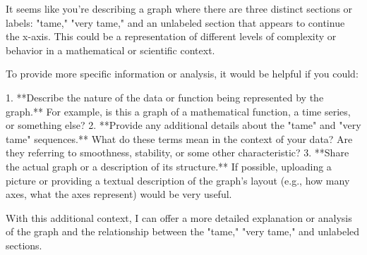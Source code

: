 It seems like you're describing a graph where there are three distinct sections or labels: "tame," "very tame," and an unlabeled section that appears to continue the x-axis. This could be a representation of different levels of complexity or behavior in a mathematical or scientific context.

To provide more specific information or analysis, it would be helpful if you could:

1. **Describe the nature of the data or function being represented by the graph.** For example, is this a graph of a mathematical function, a time series, or something else?
2. **Provide any additional details about the "tame" and "very tame" sequences.** What do these terms mean in the context of your data? Are they referring to smoothness, stability, or some other characteristic?
3. **Share the actual graph or a description of its structure.** If possible, uploading a picture or providing a textual description of the graph's layout (e.g., how many axes, what the axes represent) would be very useful.

With this additional context, I can offer a more detailed explanation or analysis of the graph and the relationship between the "tame," "very tame," and unlabeled sections.